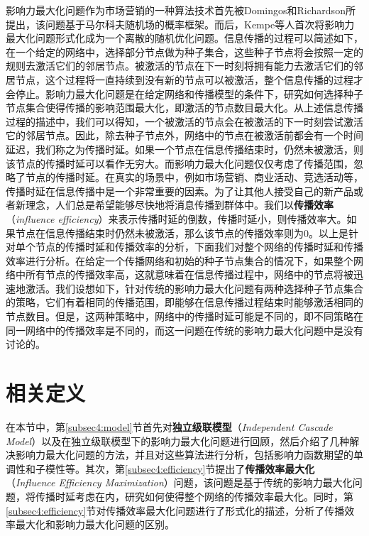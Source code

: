 影响力最大化问题作为市场营销的一种算法技术首先被Domingos和Richardson所提出，该问题基于马尔科夫随机场的概率框架。而后，Kempe等人首次将影响力最大化问题形式化成为一个离散的随机优化问题。信息传播的过程可以简述如下，在一个给定的网络中，选择部分节点做为种子集合，这些种子节点将会按照一定的规则去激活它们的邻居节点。被激活的节点在下一时刻将拥有能力去激活它们的邻居节点，这个过程将一直持续到没有新的节点可以被激活，整个信息传播的过程才会停止。影响力最大化问题是在给定网络和传播模型的条件下，研究如何选择种子节点集合使得传播的影响范围最大化，即激活的节点数目最大化。从上述信息传播过程的描述中，我们可以得知，一个被激活的节点会在被激活的下一时刻尝试激活它的邻居节点。因此，除去种子节点外，网络中的节点在被激活前都会有一个时间延迟，我们称之为传播时延。如果一个节点在信息传播结束时，仍然未被激活，则该节点的传播时延可以看作无穷大。而影响力最大化问题仅仅考虑了传播范围，忽略了节点的传播时延。在真实的场景中，例如市场营销、商业活动、竞选活动等，传播时延在信息传播中是一个非常重要的因素。为了让其他人接受自己的新产品或者新理念，人们总是希望能够尽快地将消息传播到群体中。我们以\textbf{传播效率}（\textit{influence efficiency}）来表示传播时延的倒数，传播时延小，则传播效率大。如果节点在信息传播结束时仍然未被激活，那么该节点的传播效率则为0。以上是针对单个节点的传播时延和传播效率的分析，下面我们对整个网络的传播时延和传播效率进行分析。在给定一个传播网络和初始的种子节点集合的情况下，如果整个网络中所有节点的传播效率高，这就意味着在信息传播过程中，网络中的节点将被迅速地激活。我们设想如下，针对传统的影响力最大化问题有两种选择种子节点集合的策略，它们有着相同的传播范围，即能够在信息传播过程结束时能够激活相同的节点数目。但是，这两种策略中，网络中的传播时延可能是不同的，即不同策略在同一网络中的传播效率是不同的，而这一问题在传统的影响力最大化问题中是没有讨论的。

\section{相关定义}
\label{sec4:definition}
在本节中，第\ref{subsec4:model}节首先对\textbf{独立级联模型}（\textit{Independent Cascade Model}）以及在独立级联模型下的影响力最大化问题进行回顾，然后介绍了几种解决影响力最大化问题的方法，并且对这些算法进行分析，包括影响力函数期望的单调性和子模性等。其次，第\ref{subsec4:efficiency}节提出了\textbf{传播效率最大化}（\textit{Influence Efficiency Maximization}）问题，该问题是基于传统的影响力最大化问题，将传播时延考虑在内，研究如何使得整个网络的传播效率最大化。同时，第\ref{subsec4:efficiency}节对传播效率最大化问题进行了形式化的描述，分析了传播效率最大化和影响力最大化问题的区别。

